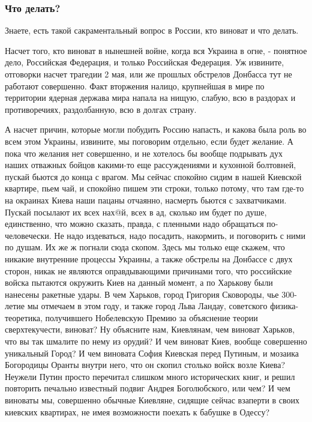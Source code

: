  
 
 
 
 
\subsubsection{Что делать?}

Знаете, есть такой сакраментальный вопрос в России, кто виноват и что делать.

Насчет того, кто виноват в нынешней войне, когда вся Украина в огне, - понятное
дело, Российская Федерация, и только Российская Федерация. Уж извините,
отговорки насчет трагедии 2 мая, или же прошлых обстрелов Донбасса тут не
работают совершенно. Факт вторжения налицо, крупнейшая в мире по территории
ядерная держава мира напала на нищую, слабую, всю в раздорах и противоречиях,
раздолбанную, всю в долгах страну. 

А насчет причин, которые могли побудить Россию напасть, и какова была роль во
всем этом Украины, извините, мы поговорим отдельно, если будет желание. А пока
что желания нет совершенно, и не хотелось бы вообще подрывать дух наших
отважных бойцов какими-то еще рассуждениями и кухонной болтовней, пускай бьются
до конца с врагом.  Мы сейчас спокойно сидим в нашей Киевской квартире, пьем
чай, и спокойно пишем эти строки, только потому, что там где-то на окраинах
Киева наши пацаны отчаянно, насмерть бьются с захватчиками. Пускай посылают их
всех нах@й, всех в ад, сколько им будет по душе, единственно, что можно
сказать, правда, с пленными надо обращаться по-человечески. Не надо издеваться,
надо посадить, накормить, и поговорить с ними по душам. Их же ж погнали сюда
скопом. Здесь мы только еще скажем, что никакие внутренние процессы Украины, а
также обстрелы на Донбассе с двух сторон, никак не являются оправдывающими
причинами того, что российские войска пытаются окружить Киев на данный момент,
а по Харькову были нанесены ракетные удары. В чем Харьков, город Григория
Сковороды, чье 300-летие мы отмечаем в этом году, и также город Льва Ландау,
советского физика-теоретика, получившего Нобелевскую Премию за объяснение
теории сверхтекучести, виноват? Ну объясните нам, Киевлянам, чем виноват
Харьков, что вы так шмалите по нему из орудий? И чем виноват Киев, вообще
совершенно уникальный Город? И чем виновата София Киевская перед Путиным, и
мозаика Богородицы Оранты внутри него, что он скопил столько войск возле Киева? Неужели
Путин просто перечитал слишком много исторических книг, и решил повторить
печально известный подвиг Андрея Боголюбского, или чем? И чем виноваты мы,
совершенно обычные Киевляне, сидящие сейчас взаперти в своих киевских
квартирах, не имея возможности поехать к бабушке в Одессу?

